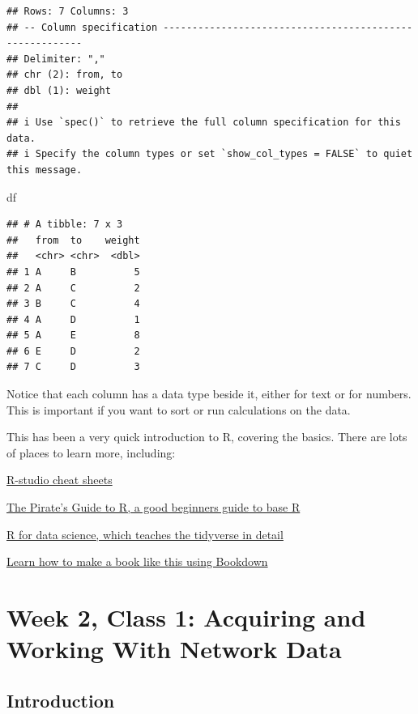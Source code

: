 \documentclass[
]{book}
\newenvironment{Shaded}{\begin{snugshade}}{\end{snugshade}}
\newcommand{\NormalTok}[1]{#1}
\begin{document}
\begin{verbatim}
## Rows: 7 Columns: 3
## -- Column specification --------------------------------------------------------
## Delimiter: ","
## chr (2): from, to
## dbl (1): weight
## 
## i Use `spec()` to retrieve the full column specification for this data.
## i Specify the column types or set `show_col_types = FALSE` to quiet this message.
\end{verbatim}

\begin{Shaded}
\begin{Highlighting}[]
\NormalTok{df}
\end{Highlighting}
\end{Shaded}

\begin{verbatim}
## # A tibble: 7 x 3
##   from  to    weight
##   <chr> <chr>  <dbl>
## 1 A     B          5
## 2 A     C          2
## 3 B     C          4
## 4 A     D          1
## 5 A     E          8
## 6 E     D          2
## 7 C     D          3
\end{verbatim}

Notice that each column has a data type beside it, either for text or for numbers. This is important if you want to sort or run calculations on the data.

This has been a very quick introduction to R, covering the basics. There are lots of places to learn more, including:

\href{https://www.rstudio.com/resources/cheatsheets/}{R-studio cheat sheets}

\href{https://bookdown.org/ndphillips/YaRrr/}{The Pirate's Guide to R, a good beginners guide to base R}

\href{https://r4ds.had.co.nz}{R for data science, which teaches the tidyverse in detail}

\href{https://bookdown.org/yihui/bookdown/introduction.html}{Learn how to make a book like this using Bookdown}

\hypertarget{week-2-class-1-acquiring-and-working-with-network-data}{%
\chapter{Week 2, Class 1: Acquiring and Working With Network Data}\label{week-2-class-1-acquiring-and-working-with-network-data}}

\hypertarget{introduction-1}{%
\section{Introduction}\label{introduction-1}}
\end{document}
